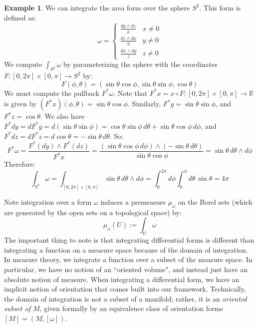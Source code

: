 \documentclass[11pt, oneside]{article}   	%
\theoremstyle{definition}
\newtheorem{example}{Example}[section]
\begin{document}
\begin{example}
	We can integrate the area form over the sphere $S^2$. This form is defined as:
	\begin{equation}
		\omega = \begin{cases}
			\frac{dy\wedge dz}{x} & x\neq 0 \\
			\frac{dz\wedge dx}{y} & y\neq 0 \\
			\frac{dx\wedge dy}{z} & z\neq 0
		\end{cases}
	\end{equation}
	We compute $\int_{S^2}\omega$ by parameterizing the sphere with the coordinates $F : [0, 2\pi]\times [0, \pi]
	\rightarrow S^2$ by:
	\begin{equation}
		F(\phi, \theta) = (\sin\theta\cos\phi, \sin\theta\sin\phi, \cos\theta)
	\end{equation}
	We must compute the pullback $F^*\omega$. Note that $F^* x = x\circ F : [0, 2\pi]\times [0, \pi]\rightarrow\mathbb 
	R$ is given by $(F^* x)(\phi, \theta) = \sin\theta\cos\phi$. Similarly, $F^* y = \sin\theta\sin\phi$, and $F^* z = \cos\theta$. 
	We also have $F^* dy = dF^*y = d(\sin\theta\sin\phi) = \cos\theta\sin\phi\,d\theta + \sin\theta\cos\phi\,d\phi$, and 
	$F^* dz = dF^* z = d\cos\theta = -\sin\theta\,d\theta$. So:
	\begin{equation}
		F^*\omega = \frac{F^*(dy)\wedge F^*(dz)}{F^*x} = \frac{(\sin\theta\cos\phi\,d\phi)\wedge (-\sin\theta\,d\theta)}{\sin
		\theta\cos\phi} = \sin\theta\,d\theta\wedge d\phi
	\end{equation}
	Therefore:
	\begin{equation}
		\int_{S^2}\omega = \int_{[0, 2\pi]\times [0, \pi]}\sin\theta\,d\theta\wedge d\phi = \int_0^{2\pi} d\phi\int_0^\phi d\theta
		\,\sin\theta = 4\pi
	\end{equation}
\end{example}

Note integration over a form $\omega$ induces a premeasure $\mu_\omega$ on the Borel sets (which are generated by 
the open sets on a topological space) by:
\begin{equation}
	\mu_\omega(U) :=\int_U\omega
\end{equation}
The important thing to note is that integrating differential forms is different than integrating a function on a measure space 
because of the domain of integration. In measure theory, we integrate a function over a subset of the measure space. 
In particular, we have no notion of an ``oriented volume", and instead just have an absolute notion of measure. When 
integrating a differential form, we have an implicit notion of orientation that comes built into our framework. Technically, 
the domain of integration is not a subset of a manifold; rather, it is an \textit{oriented subset of $M$}, given formally 
by an equivalence class of orientation forms $[M] = (M, [\omega])$. 
\end{document}
